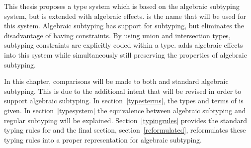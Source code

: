 This thesis proposes a type system which is based on the algebraic subtyping system, but is extended with algebraic effects. \core is the name that will be used for this system. Algebraic subtyping has support for subtyping, but eliminates the disadvantage of having constraints. By using union and intersection types, subtyping constraints are explicitly coded within a type. \core adds algebraic effects into this system while simultaneously still preserving the properties of algebraic subtyping.

In this chapter, comparisons will be made to both \eff and standard algebraic subtyping. This is due to the additional intent that \eff will be revised in order to support algebraic subtyping. In section~\ref{typesterms}, the types and terms of \core is given. In section~\ref{typesystem} the equivalence between algebraic subtyping and regular subtyping will be explained. Section~\ref{typingrules} provides the standard typing rules for \core and the final section, section~\ref{reformulated}, reformulates these typing rules into a proper representation for algebraic subtyping.
